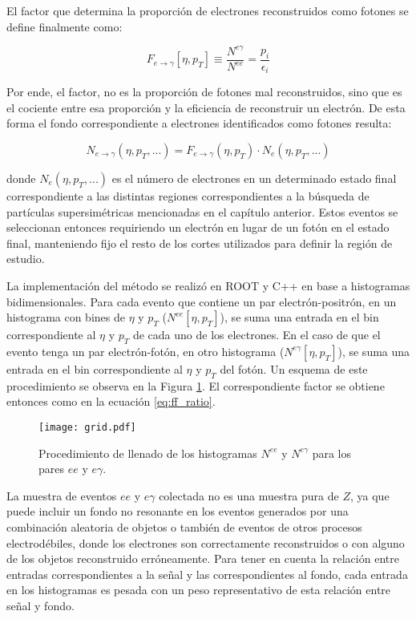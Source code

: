 El factor que determina la proporción de electrones reconstruidos como fotones se define finalmente como:

\begin{equation}
F_{e\rightarrow\gamma}[\eta , p_{T}]\equiv\frac{N^{e\gamma}}{N^{ee}}=\frac{p_{i}}{\epsilon_{i}}
\end{equation}

Por ende, el factor, no es la proporción de fotones mal reconstruidos, sino que es el cociente entre esa proporción y la eficiencia de reconstruir un electrón. De esta forma el fondo correspondiente a electrones identificados como fotones resulta:

\begin{equation}
N_{e\rightarrow\gamma}(\eta , p_{T} , ... ) = F_{e\rightarrow\gamma}(\eta , p_{T})\cdot N_{e}(\eta , p_{T} , ...)
\end{equation}
	
\noindent
donde $N_{e}(\eta , p_{T} , ...)$ es el número de electrones en un determinado estado final correspondiente a las distintas regiones correspondientes a la búsqueda de partículas supersimétricas mencionadas en el capítulo anterior. Estos eventos se seleccionan entonces requiriendo un electrón en lugar de un fotón en el estado final, manteniendo fijo el resto de los cortes utilizados para definir la región de estudio. 

La implementación del método se realizó en ROOT \cite{Brun:1997pa} y C++ en base a histogramas bidimensionales. Para cada evento que contiene un par electrón-positrón, en un histograma con bines de $\eta$ y $p_{T}$ ($N^{ee}[\eta , p_{T}]$), se suma una entrada en el bin correspondiente al $\eta$ y $p_{T}$ de cada uno de los electrones. En el caso de que el evento tenga un par electrón-fotón, en otro histograma ($N^{e\gamma}[\eta , p_{T}]$), se suma una entrada en el bin correspondiente al $\eta$ y $p_{T}$ del fotón. Un esquema de este procedimiento se observa en la Figura \ref{grid}. El correspondiente factor se obtiene entonces como en la ecuación \ref{eq:ff_ratio}.

\begin{figure}
\centering
\texttt{[image: grid.pdf]}
\caption{Procedimiento de llenado de los histogramas $N^{ee}$ y $N^{e\gamma}$ para los pares $ee$ y $e\gamma$.}
\label{grid}
\end{figure}

La muestra de eventos $ee$ y $e\gamma$ colectada no es una muestra pura de $Z$, ya que puede incluir un fondo no resonante en los eventos generados por una combinación aleatoria de objetos o también de eventos de otros procesos electrodébiles, donde los electrones son correctamente reconstruidos o con alguno de los objetos reconstruido erróneamente. Para tener en cuenta la relación entre entradas correspondientes a la señal y las correspondientes al fondo, cada entrada en los histogramas es pesada con un peso representativo de esta relación entre señal y fondo.

